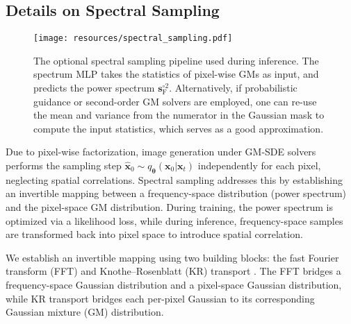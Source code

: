 \documentclass{article}
\def\vtheta{{\bm{\theta}}}
\def\vs{{\bm{s}}}
\def\vx{{\bm{x}}}
\theoremstyle{custom}
\theoremstyle{definition}
\theoremstyle{remark}
\begin{document}
\subsection{Details on Spectral Sampling}
\label{sec:spectral}

\begin{figure*}[t]
\begin{center}
\texttt{[image: resources/spectral\_sampling.pdf]}
\caption{
The optional spectral sampling pipeline used during inference. The spectrum MLP takes the statistics of pixel-wise GMs as input, and predicts the power spectrum $\vs_\text{F}^{\circ 2}$. Alternatively, if probabilistic guidance or second-order GM solvers are employed, one can re-use the mean and variance from the numerator in the Gaussian mask to compute the input statistics, which serves as a good approximation.}
\label{fig:spectral_sampling}
\end{center}
\end{figure*}

Due to pixel-wise factorization, image generation under GM-SDE solvers performs the sampling step $\hat{\vx}_0 \sim q_\vtheta(\vx_0|\vx_t)$ independently for each pixel, neglecting spatial correlations. Spectral sampling addresses this by establishing an invertible mapping between a frequency-space distribution (power spectrum) and the pixel-space GM distribution. During training, the power spectrum is optimized via a likelihood loss, while during inference, frequency-space samples are transformed back into pixel space to introduce spatial correlation.

We establish an invertible mapping using two building blocks: the fast Fourier transform (FFT) and Knothe--Rosenblatt (KR) transport \cite{knothe1957contributions,rosenblatt1952remarks}. The FFT bridges a frequency-space Gaussian distribution and a pixel-space Gaussian distribution, while KR transport bridges each per-pixel Gaussian to its corresponding Gaussian mixture (GM) distribution. 
\end{document}
